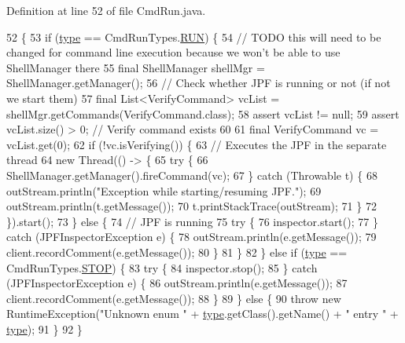 Definition at line 52 of file Cmd\+Run.\+java.


\begin{DoxyCode}
52                                                                                                            
                          \{
53     \textcolor{keywordflow}{if} (\hyperlink{classgov_1_1nasa_1_1jpf_1_1inspector_1_1client_1_1commands_1_1_cmd_run_ab15ead52f55e938e9d4b682e1ecbdf0e}{type} == CmdRunTypes.\hyperlink{enumgov_1_1nasa_1_1jpf_1_1inspector_1_1client_1_1commands_1_1_cmd_run_1_1_cmd_run_types_a1fdedcc1b636def90bded4038dc39abc}{RUN}) \{
54       \textcolor{comment}{// TODO this will need to be changed for command line execution because we won't be able to use
       ShellManager there}
55       \textcolor{keyword}{final} ShellManager shellMgr = ShellManager.getManager();
56       \textcolor{comment}{// Check whether JPF is running or not (if not we start them)}
57       \textcolor{keyword}{final} List<VerifyCommand> vcList = shellMgr.getCommands(VerifyCommand.class);
58       assert vcList != null;
59       assert vcList.size() > 0; \textcolor{comment}{// Verify command exists}
60 
61       \textcolor{keyword}{final} VerifyCommand vc = vcList.get(0);
62       \textcolor{keywordflow}{if} (!vc.isVerifying()) \{
63         \textcolor{comment}{// Executes the JPF in the separate thread}
64         \textcolor{keyword}{new} Thread(() -> \{
65           \textcolor{keywordflow}{try} \{
66             ShellManager.getManager().fireCommand(vc);
67           \} \textcolor{keywordflow}{catch} (Throwable t) \{
68             outStream.println(\textcolor{stringliteral}{"Exception while starting/resuming JPF."});
69             outStream.println(t.getMessage());
70             t.printStackTrace(outStream);
71           \}
72         \}).start();
73       \} \textcolor{keywordflow}{else} \{
74         \textcolor{comment}{// JPF is running}
75         \textcolor{keywordflow}{try} \{
76           inspector.start();
77         \} \textcolor{keywordflow}{catch} (JPFInspectorException e) \{
78           outStream.println(e.getMessage());
79           client.recordComment(e.getMessage());
80         \}
81       \}
82     \} \textcolor{keywordflow}{else} \textcolor{keywordflow}{if} (\hyperlink{classgov_1_1nasa_1_1jpf_1_1inspector_1_1client_1_1commands_1_1_cmd_run_ab15ead52f55e938e9d4b682e1ecbdf0e}{type} == CmdRunTypes.\hyperlink{enumgov_1_1nasa_1_1jpf_1_1inspector_1_1client_1_1commands_1_1_cmd_run_1_1_cmd_run_types_a1284694759a2df2899bce81991b3e489}{STOP}) \{
83       \textcolor{keywordflow}{try} \{
84         inspector.stop();
85       \} \textcolor{keywordflow}{catch} (JPFInspectorException e) \{
86         outStream.println(e.getMessage());
87         client.recordComment(e.getMessage());
88       \}
89     \} \textcolor{keywordflow}{else} \{
90       \textcolor{keywordflow}{throw} \textcolor{keyword}{new} RuntimeException(\textcolor{stringliteral}{"Unknown enum "} + \hyperlink{classgov_1_1nasa_1_1jpf_1_1inspector_1_1client_1_1commands_1_1_cmd_run_ab15ead52f55e938e9d4b682e1ecbdf0e}{type}.getClass().getName() + \textcolor{stringliteral}{" entry "} + 
      \hyperlink{classgov_1_1nasa_1_1jpf_1_1inspector_1_1client_1_1commands_1_1_cmd_run_ab15ead52f55e938e9d4b682e1ecbdf0e}{type});
91     \}
92   \}
\end{DoxyCode}
